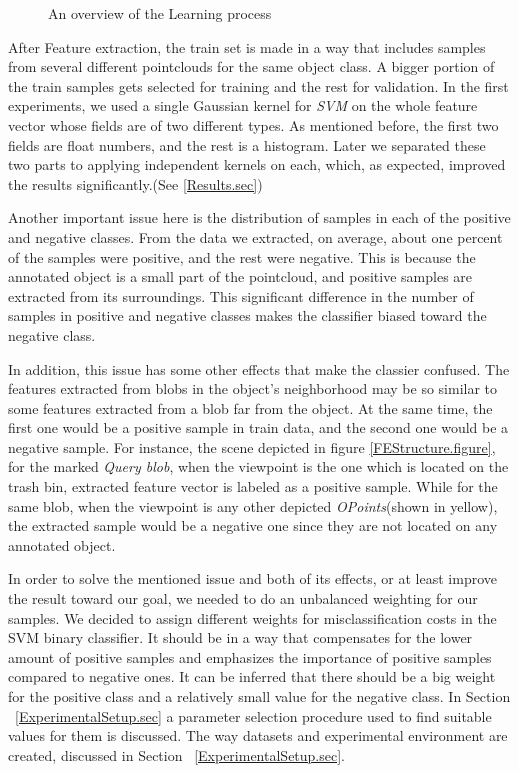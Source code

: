 \begin{figure}[t]
  \caption[Learning overview]
  {An overview of the Learning process}
  \label{LearningFlowchart.figure}
\end{figure}

After Feature extraction, the train set is made in a way that includes samples from several different pointclouds for the same object class. A bigger portion of the train samples gets selected for training and the rest for validation. In the first experiments, we used a single Gaussian kernel for {\it SVM} on the whole feature vector whose fields are of two different types. As mentioned before, the first two fields are float numbers, and the rest is a histogram. Later we separated these two parts to applying independent kernels on each, which, as expected, improved the results significantly.(See \ref{Results.sec}) 


Another important issue here is the distribution of samples in each of the positive and negative classes. From the data we extracted, on average, about one percent of the samples were positive, and the rest were negative. This is because the annotated object is a small part of the pointcloud, and positive samples are extracted from its surroundings. This significant difference in the number of samples in positive and negative classes makes the classifier biased toward the negative class. 


In addition, this issue has some other effects that make the classier confused. The features extracted from blobs in the object's neighborhood may be so similar to some features extracted from a blob far from the object. At the same time, the first one would be a positive sample in train data, and the second one would be a negative sample. For instance, the scene depicted in figure \ref{FEStructure.figure}, for the marked {\it Query blob}, when the viewpoint is the one which is located on the trash bin, extracted feature vector is labeled as a positive sample. While for the same blob, when the viewpoint is any other depicted {\it OPoints}(shown in yellow), the extracted sample would be a negative one since they are not located on any annotated object. 


In order to solve the mentioned issue and both of its effects, or at least improve the result toward our goal, we needed to do an unbalanced weighting for our samples. We decided to assign different weights for misclassification costs in the SVM binary classifier. It should be in a way that compensates for the lower amount of positive samples and emphasizes the importance of positive samples compared to negative ones. It can be inferred that there should be a big weight for the positive class and a relatively small value for the negative class. In Section ~\ref{ExperimentalSetup.sec} a parameter selection procedure used to find suitable values for them is discussed. The way datasets and experimental environment are created, discussed in Section ~\ref{ExperimentalSetup.sec}.




